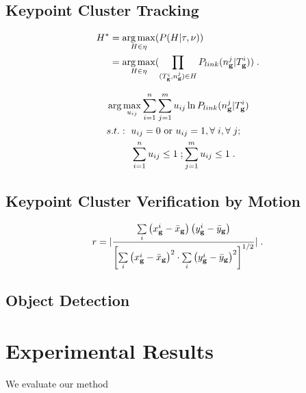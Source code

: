 \documentclass{JoITSRstyle}
\begin{document}
\subsection{Keypoint Cluster Tracking}

\begin{equation}
\begin{aligned}
{H^*} &= \mathop {\arg \max }\limits_{H \in \eta
} (P(H|\tau,\nu )) \\
&= \mathop {\arg \max }\limits_{H \in \eta }
(\prod\limits_{(T_{\bf{g}}^i,n_{\bf{g}}^j) \in H} {P_{link}(n_{\bf{g}}^j|T_{\bf{g}}^i)} ) \;.
\end{aligned}
\label{eq3}
\end{equation}

\[
\begin{aligned}
&\arg \max\limits_{u_{ij}} \sum\limits_{i = 1}^n \sum\limits_{j = 1}^m u_{ij} \ln P_{link}(n_{\bf{g}}^j|T_{\bf{g}}^i)\\
&
\begin{aligned}
    s.t.:\mbox{ }&u_{ij}=0\mbox{ or }u_{ij}=1,\forall\;i,\forall\;j;\\
    &\sum\limits_{i = 1}^n {u_{ij}} \leq 1\;; \sum\limits_{j = 1}^m {u_{ij}}\leq 1\;.
\end{aligned}
\end{aligned}
\]


\subsection{Keypoint Cluster Verification by Motion}

\begin{equation}
r =| \frac{{\sum\limits_i {\left( {{x^i_{\bf{g}}} -  {\bar x_{\bf{g}}}} \right)\left( {{y^i_{\bf{g}}} -  {\bar y_{\bf{g}}}} \right)} }}{{{{\left[ {\sum\limits_i {{{\left( {{x^i_{\bf{g}}} -  {\bar x_{\bf{g}}}} \right)}^2} \cdot \sum\limits_i {{{\left( {{y^i_{\bf{g}}} -  {\bar y_{\bf{g}}}} \right)}^2}} } } \right]}^{1/2}}}}|\;.
\label{eq4}
\end{equation}

\subsection{Object Detection}







\section{Experimental Results}
We evaluate our method 
\end{document}
